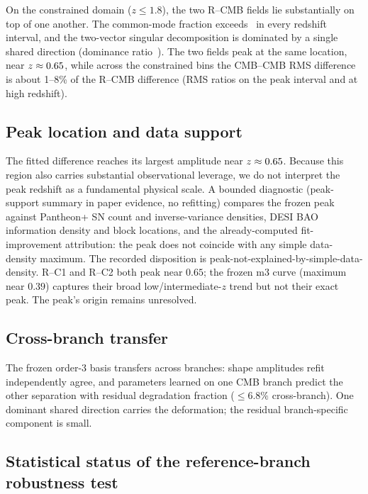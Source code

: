 On the constrained domain ($z\le1.8$), the two R--CMB fields lie
substantially on top of one another. The common-mode fraction
exceeds~\GeometryCommonFractionMin{} in every redshift interval, and
the two-vector singular decomposition is dominated by a single
shared direction (dominance ratio~\GeometrySvdDominance{}). The two
fields peak at the same location, near
$z\approx0.65{}$, while across the constrained bins the
CMB--CMB RMS difference is about 1--8\% of the R--CMB difference (RMS ratios
\GeometryCmbRatioLow{} on the peak interval and
\GeometryCmbRatioHigh{} at high redshift).

\subsection{Peak location and data support}
\label{sec:peak-support}

The fitted difference reaches its largest amplitude near
$z\approx0.65{}$. Because this region also carries
substantial observational leverage, we do not interpret the peak
redshift as a fundamental physical scale. A bounded diagnostic
(peak-support summary in paper evidence,
no refitting) compares the frozen peak against Pantheon+ SN count
and inverse-variance densities, DESI BAO information density and
block locations, and the already-computed fit-improvement attribution: the peak
does not coincide with any simple data-density maximum. The
recorded disposition is peak-not-explained-by-simple-data-density.
R--C1 and R--C2 both peak near $0.65$; the frozen m3 curve (maximum
near $0.39$) captures their broad low/intermediate-$z$ trend but not
their exact peak. The peak's origin remains unresolved.

\subsection{Cross-branch transfer}

The frozen order-3 basis transfers across branches: shape amplitudes
refit independently agree, and parameters learned on one CMB branch
predict the other separation with residual degradation fraction
\GeometryTransferDegradation{} ($\le 6.8\%$ cross-branch). One
dominant shared direction carries the deformation; the residual
branch-specific component is small.

\subsection{Statistical status of the reference-branch robustness test}
\label{sec:robustness-stats}

